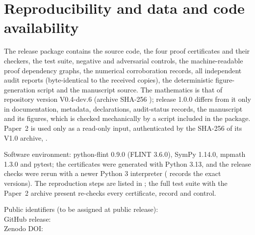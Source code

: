 \section{Reproducibility and data and code availability}\label{sec:repro}

The release package \citep{Repo3} contains the source code, the four proof certificates and their checkers, the test
suite, negative and adversarial controls, the machine-readable proof dependency graphs, the numerical corroboration
records, all independent audit reports (byte-identical to the received copies), the deterministic figure-generation
script and the manuscript source. The mathematics is that of repository version V0.4-dev.6 (archive SHA-256
); release 1.0.0 differs from it only in
documentation, metadata, declarations, audit-status records, the manuscript and its figures, which is checked mechanically by a script
included in the package. Paper~2 is used only as a read-only input, authenticated by the SHA-256 of its V1.0 archive,
.

Software environment: python-flint 0.9.0 (FLINT 3.6.0), SymPy 1.14.0, mpmath 1.3.0 and pytest; the certificates were
generated with Python 3.13, and the release checks were rerun with a newer Python 3 interpreter
( records the exact versions). The
reproduction steps are listed in ; the full test suite with the Paper~2 archive present
re-checks every certificate, record and control.

\medskip
\noindent Public identifiers (to be assigned at public release):\\
GitHub release: \PaperThreeGitHub\\
Zenodo DOI: \PaperThreeDOI
